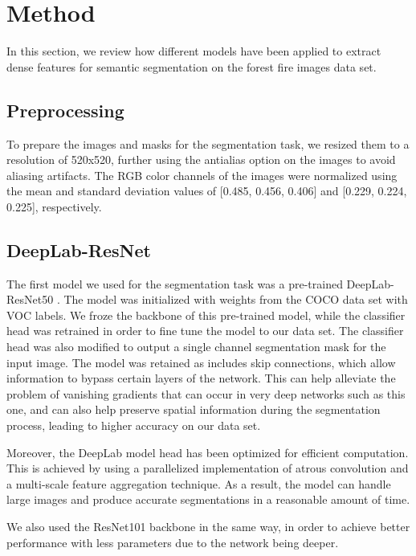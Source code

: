 \section{Method}

In this section, we review how different models have been applied to extract dense features for semantic segmentation on the forest fire images data set.

\subsection{Preprocessing}

To prepare the images and masks for the segmentation task, we resized them to a resolution of 520x520, further using the antialias option on the images to avoid aliasing artifacts. The RGB color channels of the images were normalized using the mean and standard deviation values of [0.485, 0.456, 0.406] and [0.229, 0.224, 0.225], respectively.

\subsection{DeepLab-ResNet}

The first model we used for the segmentation task was a pre-trained DeepLab-ResNet50 \cite{chen_rethinking_2017}. The model was initialized with weights from the COCO data set with VOC labels. We froze the backbone of this pre-trained model, while the classifier head was retrained in order to fine tune the model to our data set. The classifier head was also modified to output a single channel segmentation mask for the input image. The model was retained as includes skip connections, which allow information to bypass certain layers of the network. This can help alleviate the problem of vanishing gradients that can occur in very deep networks such as this one, and can also help preserve spatial information during the segmentation process, leading to higher accuracy on our data set.

Moreover, the DeepLab \cite{chen_rethinking_2017} model head has been optimized for efficient computation. This is achieved by using a parallelized implementation of atrous convolution and a multi-scale feature aggregation technique. As a result, the model can handle large images and produce accurate segmentations in a reasonable amount of time.

We also used the ResNet101 backbone in the same way, in order to achieve better performance with less parameters due to the network being deeper.

